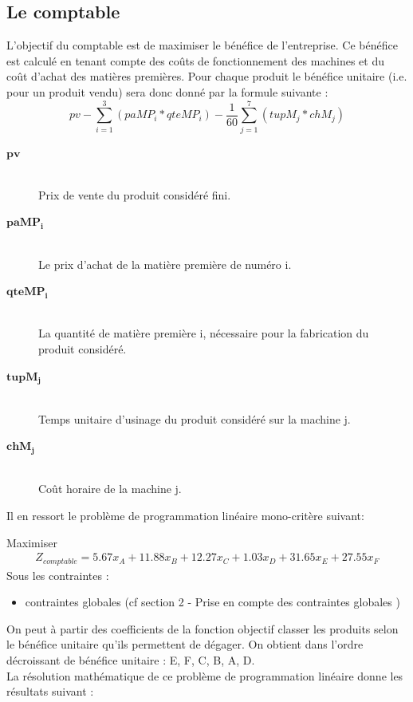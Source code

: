 \documentclass[12pt]{article}
\begin{document}
\subsection{Le comptable}
L'objectif du comptable est de maximiser le bénéfice de l'entreprise. Ce bénéfice est calculé en tenant compte des coûts de fonctionnement des machines et du coût d'achat des matières premières. Pour chaque produit le bénéfice unitaire (i.e. pour un produit vendu) sera donc donné par la formule suivante : 
\begin{equation*} 
pv - \sum_{i=1}^{3}(paMP_{i} * qteMP_{i}) - \frac{1}{60} \sum_{j=1}^{7}(tupM_{j} * chM_{j})  
\end{equation*}
\begin{description}
\item[$\boldsymbol{pv}$]\hfill \\Prix de vente du produit considéré fini.
\item[$\boldsymbol{paMP_{i}}$]\hfill \\ Le prix d'achat de la matière première de numéro i.
\item[$\boldsymbol{qteMP_{i}}$]\hfill \\ La quantité de matière première i, nécessaire pour la fabrication du produit considéré.
\item[$\boldsymbol{tupM_{j}}$]\hfill \\ Temps unitaire d'usinage du produit considéré sur la machine j.
\item[$\boldsymbol{chM_{j}}$]\hfill \\ Coût horaire de la machine j.
\end{description}
Il en ressort le problème de programmation linéaire mono-critère suivant:
\begin{tcolorbox}
Maximiser
\begin{align*}
Z_{comptable}= 5.67x_{A} +11.88x_{B} +12.27x_{C} +1.03x_{D} +31.65x_{E} +27.55x_{F}
\end{align*}
Sous les contraintes :
\begin{itemize}
\item contraintes globales (cf section 2 - Prise en compte des contraintes globales )
\end{itemize}
\end{tcolorbox}
On peut à partir des coefficients de la fonction objectif classer les produits selon le bénéfice unitaire qu'ils permettent de dégager. On obtient dans l'ordre décroissant de bénéfice unitaire : E, F, C, B, A, D.\\
La résolution mathématique de ce problème de programmation linéaire donne les résultats suivant :
\end{document}
